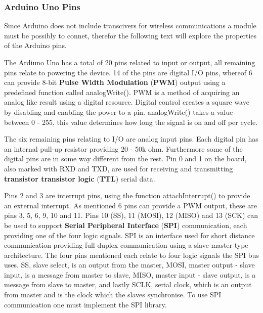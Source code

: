 \subsubsection{Arduino Uno Pins}\label{subsubsec:arduino-uno-pins}
Since Arduino does not include transcivers for wireless communications a module must be possibly to connet, therefor the  following text will explore the properties of the Arduino pins.
\smallskip

The Ardiuno Uno has a total of 20 pins related to input or output, all remaining pins relate to powering the device.
14 of the pins are digital I/O pins, whereof 6 can provide 8-bit \textbf{Pulse Width Modulation} (\textbf{PWM}) output using a predefined function called analogWrite(). %
PWM is a method of acquiring an analog like result using a digital resource.
Digital control creates a square wave by disabling and enabling the power to a pin.
analogWrite() takes a value between 0 - 255, this value determines how long the signal is on and off per cycle.

The six remaining pins relating to I/O are analog input pins.
Each digital pin has an internal pull-up resistor providing 20 - 50k ohm.
Furthermore some of the digital pins are in some way different from the rest.
Pin 0 and 1 on the board, also marked with RXD and TXD, are used for receiving and transmitting \textbf{transistor transistor logic} (\textbf{TTL}) serial data. %


Pins 2 and 3 are interrupt pins, using the function attachInterrupt() to provide an external interrupt. %
As mentioned 6 pins can provide a PWM output, these are pins 3, 5, 6, 9, 10 and 11.
Pins 10 (SS), 11 (MOSI), 12 (MISO) and 13 (SCK) can be used to support \textbf{Serial Peripheral Interface} (\textbf{SPI}) communication, each providing one of the four logic signals. %
SPI is an interface used for short distance communication providing full-duplex communication using a slave-master type architecture.
The four pins mentioned each relate to four logic signals the SPI bus uses.
SS, slave select, is an output from the master, MOSI, master output - slave input, is a message from master to slave, MISO, master input - slave output, is a message from slave to master, and lastly SCLK, serial clock, which is an output from master and is the clock which the slaves synchronise.
To use SPI communication one must implement the SPI library.

